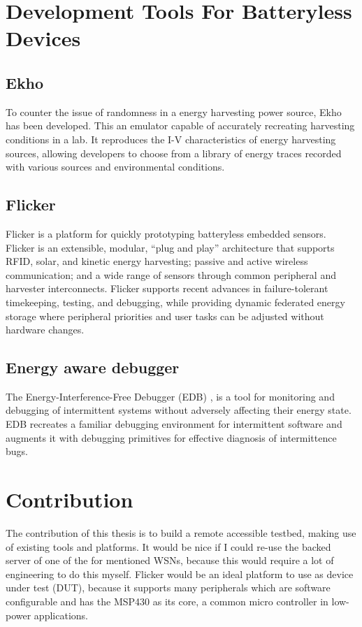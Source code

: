 \section{Development Tools For Batteryless Devices}

\subsection{Ekho}

To counter the issue of randomness in a energy harvesting power source, Ekho \cite{ekho} has been developed. This an emulator capable of accurately recreating harvesting conditions in a lab. It reproduces the I-V characteristics of energy harvesting sources, allowing developers to choose from a library of energy traces recorded with various sources and environmental conditions.

\subsection{Flicker}
Flicker \cite{flicker} is a platform for quickly prototyping batteryless embedded sensors. Flicker is an extensible, modular, “plug and play” architecture that supports RFID, solar, and kinetic energy harvesting; passive and active wireless communication; and a wide range of sensors through common peripheral and harvester interconnects. Flicker supports recent advances in failure-tolerant timekeeping, testing, and debugging, while providing dynamic federated energy storage where peripheral priorities and user tasks can be adjusted without hardware changes.

\subsection{Energy aware debugger}
The Energy-Interference-Free Debugger (EDB) \cite{edb}, is a tool for monitoring and debugging of intermittent systems without adversely affecting their energy state. EDB recreates a familiar debugging environment for intermittent software and augments it with debugging primitives for effective diagnosis of intermittence bugs.

\section{Contribution}
The contribution of this thesis is to build a remote accessible testbed, making use of existing tools and platforms. It would be nice if I could re-use the backed server of one of the for mentioned WSNs, because this would require a lot of engineering to do this myself. Flicker would be an ideal platform to use as device under test (DUT), because it supports many peripherals which are software configurable and has the MSP430 as its core, a common micro controller in low-power applications.

